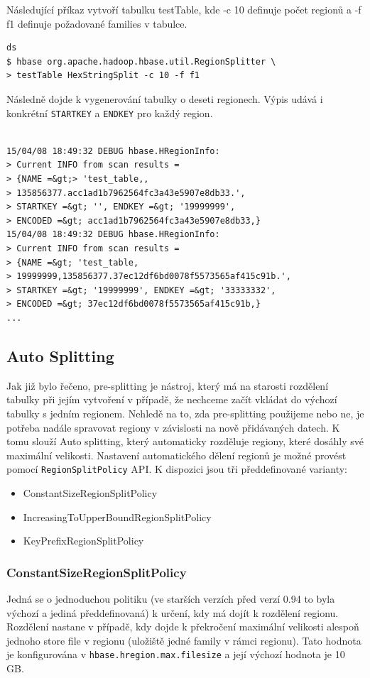 \documentclass[thesis=M,czech]{FITthesis}[2012/06/26]
\begin{document}
Následující příkaz vytvoří tabulku testTable, kde -c 10 definuje počet regionů a -f f1 definuje požadované families v tabulce.

\medskip
\begin{lstlisting}[frame=single]  % Start your code-block
ds
$ hbase org.apache.hadoop.hbase.util.RegionSplitter \
> testTable HexStringSplit -c 10 -f f1

\end{lstlisting}
\medskip
Následně dojde k vygenerování tabulky o deseti regionech. Výpis udává i konkrétní \texttt{STARTKEY} a \texttt{ENDKEY} pro každý region. 
\medskip
\begin{lstlisting}[frame=single]  % Start your code-block
 
15/04/08 18:49:32 DEBUG hbase.HRegionInfo:
> Current INFO from scan results = 
> {NAME =&gt;> 'test_table,,
> 135856377.acc1ad1b7962564fc3a43e5907e8db33.', 
> STARTKEY =&gt; '', ENDKEY =&gt; '19999999', 
> ENCODED =&gt; acc1ad1b7962564fc3a43e5907e8db33,}
15/04/08 18:49:32 DEBUG hbase.HRegionInfo: 
> Current INFO from scan results = 
> {NAME =&gt; 'test_table,
> 19999999,135856377.37ec12df6bd0078f5573565af415c91b.', 
> STARTKEY =&gt; '19999999', ENDKEY =&gt; '33333332', 
> ENCODED =&gt; 37ec12df6bd0078f5573565af415c91b,}
...

\end{lstlisting}
\pagebreak
\subsection{Auto Splitting}
Jak již bylo řečeno, pre-splitting je nástroj, který má na starosti rozdělení tabulky při jejím vytvoření v případě, že nechceme začít vkládat do výchozí tabulky s jedním regionem. Nehledě na to, zda pre-splitting použijeme nebo ne, je potřeba nadále spravovat regiony v závislosti na nově přidávaných datech. K tomu slouží Auto splitting, který automaticky rozděluje regiony, které dosáhly své maximální velikosti. Nastavení automatického dělení regionů je možné provést pomocí \texttt{RegionSplitPolicy} API. K dispozici jsou tři předdefinované varianty:

\begin{itemize}
	\item ConstantSizeRegionSplitPolicy
	\item IncreasingToUpperBoundRegionSplitPolicy
	\item KeyPrefixRegionSplitPolicy
\end{itemize} 

\subsubsection{ConstantSizeRegionSplitPolicy}
Jedná se o jednoduchou politiku (ve starších verzích před verzí 0.94 to byla výchozí a jediná předdefinovaná) k určení, kdy má dojít k rozdělení regionu. Rozdělení nastane v případě, kdy dojde k překročení maximální velikosti alespoň jednoho store file v regionu (uložiště jedné family v rámci regionu). Tato hodnota je konfigurována v \texttt{hbase.hregion.max.filesize} a její výchozí hodnota je 10 GB. 
\end{document}
